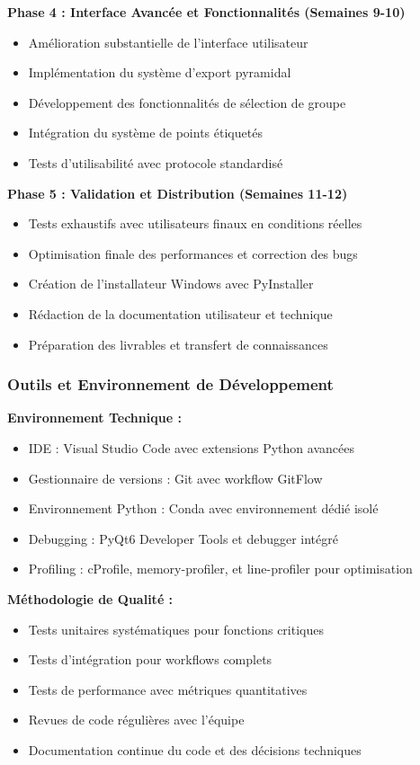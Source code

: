 \documentclass[12pt,a4paper]{article}
\begin{document}
\textbf{Phase 4 : Interface Avancée et Fonctionnalités (Semaines 9-10)}
\begin{itemize}
\item Amélioration substantielle de l'interface utilisateur
\item Implémentation du système d'export pyramidal
\item Développement des fonctionnalités de sélection de groupe
\item Intégration du système de points étiquetés
\item Tests d'utilisabilité avec protocole standardisé
\end{itemize}

\textbf{Phase 5 : Validation et Distribution (Semaines 11-12)}
\begin{itemize}
\item Tests exhaustifs avec utilisateurs finaux en conditions réelles
\item Optimisation finale des performances et correction des bugs
\item Création de l'installateur Windows avec PyInstaller
\item Rédaction de la documentation utilisateur et technique
\item Préparation des livrables et transfert de connaissances
\end{itemize}

\subsubsection{Outils et Environnement de Développement}

\textbf{Environnement Technique :}
\begin{itemize}
\item IDE : Visual Studio Code avec extensions Python avancées
\item Gestionnaire de versions : Git avec workflow GitFlow
\item Environnement Python : Conda avec environnement dédié isolé
\item Debugging : PyQt6 Developer Tools et debugger intégré
\item Profiling : cProfile, memory-profiler, et line-profiler pour optimisation
\end{itemize}

\textbf{Méthodologie de Qualité :}
\begin{itemize}
\item Tests unitaires systématiques pour fonctions critiques
\item Tests d'intégration pour workflows complets
\item Tests de performance avec métriques quantitatives
\item Revues de code régulières avec l'équipe
\item Documentation continue du code et des décisions techniques
\end{itemize}
\end{document}
